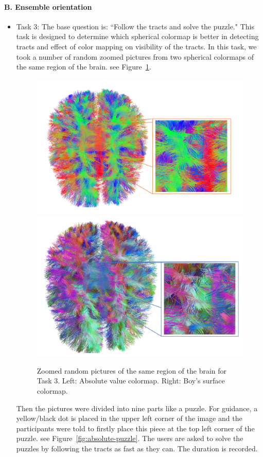 \documentclass[a4paper, 12pt]{report}
\begin{document}
\paragraph{B. Ensemble orientation}

\begin{itemize}
\item{Task 3:} The base question is: ``Follow the tracts and solve the puzzle."
This task is designed to determine which spherical colormap is better in detecting tracts and effect of color mapping on visibility of the tracts. In this task, we took a number of random zoomed pictures from two spherical colormaps of the same region of the brain. see Figure~\ref{fig:absolute-zoomed}.

\begin{figure}[ht]
    \centering
    \includegraphics[width = 0.49 \columnwidth]{absolute-zoomed}
    \includegraphics[width = 0.45 \columnwidth]{boy's-zoomed}
    \caption{Zoomed random pictures of the same region of the brain for Task 3. Left:  Absolute value colormap. Right: Boy's surface colormap.}
    \label{fig:absolute-zoomed}
\end{figure}

Then the pictures were divided into nine parts like a puzzle. For guidance, a yellow/black dot is placed in the upper left corner of the image and the participants were told to firstly place this piece at the top left corner of the puzzle. see Figure~\ref{fig:absolute-puzzle}. The users are asked to solve the puzzles by following the tracts as fast as they can. The duration is recorded. 


\end{itemize}
\end{document}
